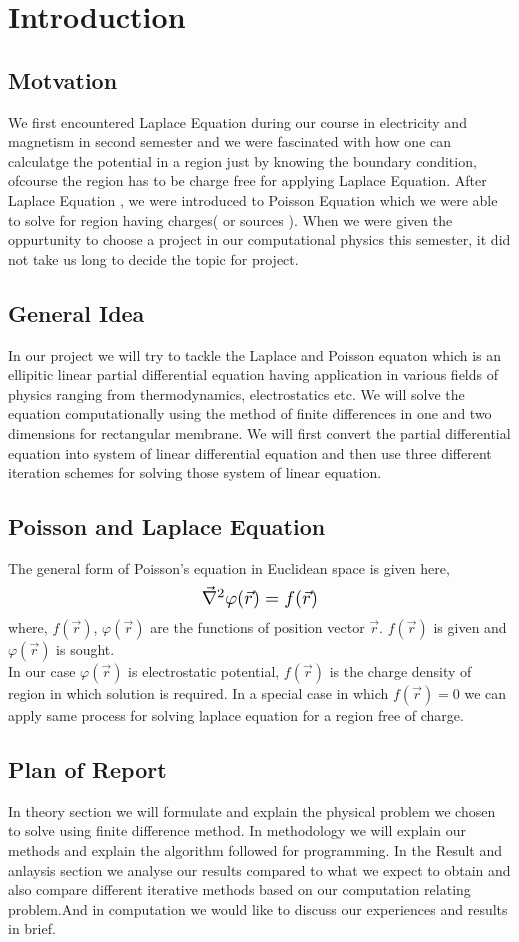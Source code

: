 	\section {Introduction}
    \subsection{Motvation}
    \noindent 
    We first encountered Laplace Equation during our course in electricity and magnetism in second semester and we were fascinated with how one can calculatge the potential in a region just by knowing the boundary condition, ofcourse the region has to be charge free for applying Laplace Equation. After Laplace Equation , we were introduced to Poisson Equation which we were able to solve for region having charges( or sources ). When we were given the oppurtunity to choose a project in our computational physics this semester, it did not take us long to decide the topic for project.
    \subsection{General Idea}
    In our project we will try to tackle the Laplace and Poisson equaton which is an ellipitic linear partial differential equation having application in various fields of physics ranging from thermodynamics, electrostatics etc. We will solve the equation computationally using the method of finite differences in one and two dimensions for rectangular membrane. We will first convert the partial differential equation into system of linear differential equation and then use three different iteration schemes for solving those system of linear equation.\\ 
    \subsection{Poisson and Laplace Equation}
    	The general form of Poisson's equation in Euclidean space is given here,
    \[
    \scalebox{1.3}{$\vec{\nabla}^2 \varphi(\vec{r}) = f(\vec{r})$}
    \]
    where, $f(\vec{r})$, $\varphi(\vec{r})$ are the functions of position vector $\vec{r}$. $f(\vec{r})$ is given and $\varphi(\vec{r})$ is sought. \\
    In our case  $\varphi(\vec{r})$ is electrostatic potential, $ f(\vec{r})$ is the charge density of region in which solution is required. In a special case in which  $f(\vec{r}) = 0 $ we can apply same process for solving laplace equation for a region free of charge.
    \subsection{Plan of Report}
    In theory section we will formulate and explain the physical problem we chosen to solve using finite difference method. In methodology we will explain our methods and explain the algorithm followed for programming. In the Result and anlaysis section we analyse our results compared to what we expect to obtain and also compare different iterative methods based on our computation relating problem.And in computation we would like to discuss our experiences and results in brief.
